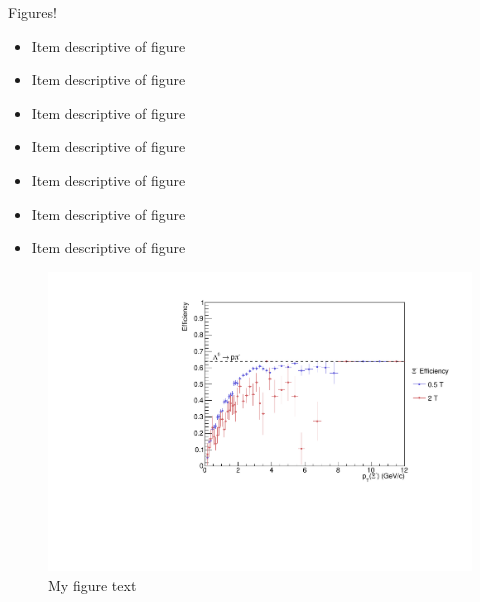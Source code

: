 \documentclass[9pt, aspectratio=169]{beamer}
\begin{document}
\begin{frame}{Figures!}
    \begin{minipage}{0.39\textwidth}
        \begin{itemize}
            \item Item descriptive of figure
            \item Item descriptive of figure
            \item Item descriptive of figure
            \item Item descriptive of figure
            \item Item descriptive of figure
            \item Item descriptive of figure
            \item Item descriptive of figure
        \end{itemize}
    \end{minipage}
    \begin{minipage}{0.59\textwidth}
        \begin{figure}[h]
            \centering
            \includegraphics[width=1\linewidth]{smi-template/XiEffVsPt.pdf}
            \caption{My figure text}
            \label{fig:enter-label}
        \end{figure}
    \end{minipage}
\end{frame}
\end{document}
